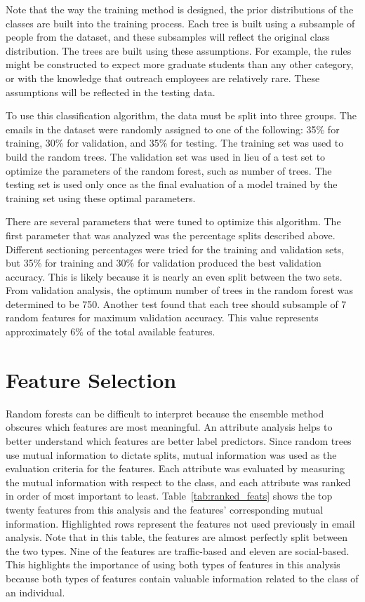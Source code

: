 \documentclass[12pt]{report}
\begin{document}
Note that the way the training method is designed, the prior distributions of the classes are built into the training process.
Each tree is built using a subsample of people from the dataset, and these subsamples will reflect the original class distribution.
The trees are built using these assumptions.
For example, the rules might be constructed to expect more graduate students than any other category, or with the knowledge that outreach employees are relatively rare.
These assumptions will be reflected in the testing data.

To use this classification algorithm, the data must be split into three groups.
The emails in the dataset were randomly assigned to one of the following: 35\% for training, 30\% for validation, and 35\% for testing.
The training set was used to build the random trees.
The validation set was used in lieu of a test set to optimize the parameters of the random forest, such as number of trees.
The testing set is used only once as the final evaluation of a model trained by the training set using these optimal parameters.

There are several parameters that were tuned to optimize this algorithm.
The first parameter that was analyzed was the percentage splits described above. 
Different sectioning percentages were tried for the training and validation sets, but 35\% for training and 30\% for validation produced the best validation accuracy.
This is likely because it is nearly an even split between the two sets.
From validation analysis, the optimum number of trees in the random forest was determined to be 750.
Another test found that each tree should subsample of 7 random features for maximum validation accuracy.
This value represents approximately 6\% of the total available features.



\section{Feature Selection} \label{ssec:feature_select}
Random forests can be difficult to interpret because the ensemble method obscures which features are most meaningful.
An attribute analysis helps to better understand which features are better label predictors.
Since random trees use mutual information to dictate splits, mutual information was used as the evaluation criteria for the features.
Each attribute was evaluated by measuring the mutual information with respect to the class, and each attribute was ranked in order of most important to least.
Table~\ref{tab:ranked_feats} shows the top twenty features from this analysis and the features' corresponding mutual information.  
Highlighted rows represent the features not used previously in email analysis.
Note that in this table, the features are almost perfectly split between the two types.
Nine of the features are traffic-based and eleven are social-based.
This highlights the importance of using both types of features in this analysis because both types of features contain valuable information related to the class of an individual.
\end{document}

